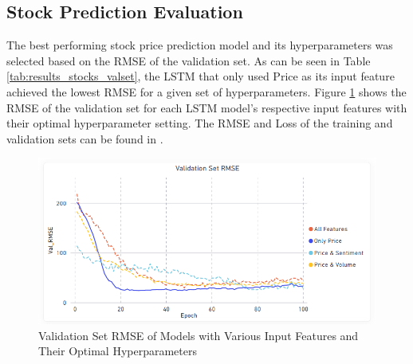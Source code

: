 \documentclass[11pt, a4paper]{article}
\begin{document}
\subsection{Stock Prediction Evaluation}
The best performing stock price prediction model and its hyperparameters was selected based on the RMSE of the validation set. As can be seen
in Table \ref{tab:results_stocks_valset}, the LSTM that only used Price as its input feature achieved the lowest RMSE for a given set of hyperparameters.
Figure \ref{fig:lstm_models_rmse_validation_set} shows the RMSE of the validation set for each LSTM model's respective input features with their optimal hyperparameter setting.
The RMSE and Loss of the training and validation sets can be found in .

\begin{table}[!h]
    \caption{Validation Set RMSE for ARIMA and LSTM Time-Series Models}
    \label{tab:results_stocks_valset}
    \centering
    \small
\end{table}

\begin{figure}[!h]
    \centering
    \includegraphics[scale = 0.45]{Best_Params_Of_Model_RMSE_Validation_Set.png}
    \caption{Validation Set RMSE of Models with Various Input Features and Their Optimal Hyperparameters}
    \label{fig:lstm_models_rmse_validation_set}
\end{figure}
\end{document}
